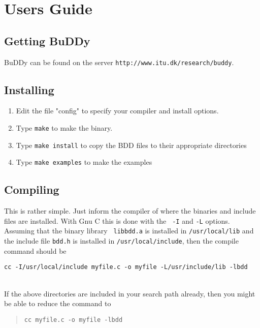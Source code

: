 \documentclass[a4paper,11pt,twoside,fleqn,openright]{report}
\newenvironment{Ill}
  {\\[\abovedisplayskip]\indent \begin{minipage}{\textwidth}}
  {\end{minipage} \\[\belowdisplayskip]}
\newenvironment{Illu}
  {\\[\abovedisplayskip] \begin{minipage}{\textwidth} \begin{quote}}
  {\end{quote} \end{minipage}}
\begin{document}
\chapter{Users Guide}


\section{Getting BuDDy}

BuDDy can be found on the server {\tt http://www.itu.dk/research/buddy}.


\section{Installing} 

\begin{enumerate}
\item Edit the file "config" to specify your compiler and install options.
  
\item Type {\tt make} to make the binary.
  
\item Type {\tt make install} to copy the BDD files to their appropriate
  directories

\item Type {\tt make examples} to make the examples

\end{enumerate}


\section{Compiling} 

This is rather simple. Just inform the compiler of where the binaries
and include files are installed. With Gnu C this is done with the {\tt
  -I} and {\tt -L} options.  Assuming that the binary library {\tt
  libbdd.a} is installed in {\tt /usr/local/lib} and the include file
{\tt bdd.h} is installed in {\tt /usr/local/include}, then the compile
command should be
%
\begin{Ill}
  {\tt cc -I/usr/local/include myfile.c -o myfile -L/usr/include/lib -lbdd}
\end{Ill}
%
If the above directories are included in your search path already, then
you might be able to reduce the command to
%
\begin{Illu}
  {\tt cc myfile.c -o myfile -lbdd}
\end{Illu}
\end{document}
